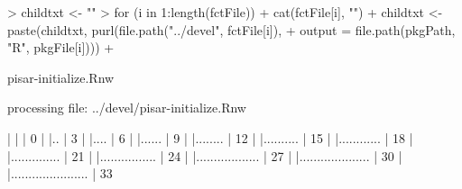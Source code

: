 \documentclass[a4paper,12pt]{article}\usepackage[]{graphicx}\usepackage[]{color}
\begin{document}
\begin{Schunk}
\begin{Sinput}
> childtxt <- ""
> for (i in 1:length(fctFile)) {
+     cat(fctFile[i], "\n")
+     childtxt <- paste(childtxt, purl(file.path("../devel", fctFile[i]), 
+         output = file.path(pkgPath, "R", pkgFile[i])))
+ }
\end{Sinput}
\begin{Soutput}
pisar-initialize.Rnw 
\end{Soutput}
\begin{Soutput}


processing file: ../devel/pisar-initialize.Rnw
\end{Soutput}
\begin{Soutput}

  |                                                                       
  |                                                                 |   0%
  |                                                                       
  |..                                                               |   3%
  |                                                                       
  |....                                                             |   6%
  |                                                                       
  |......                                                           |   9%
  |                                                                       
  |........                                                         |  12%
  |                                                                       
  |..........                                                       |  15%
  |                                                                       
  |............                                                     |  18%
  |                                                                       
  |..............                                                   |  21%
  |                                                                       
  |................                                                 |  24%
  |                                                                       
  |..................                                               |  27%
  |                                                                       
  |....................                                             |  30%
  |                                                                       
  |......................                                           |  33%

\end{Soutput}
\end{Schunk}
\end{document}
